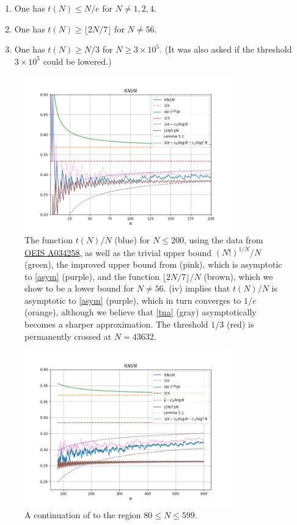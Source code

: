 \documentclass[12pt,a4paper,reqno]{amsart}
\numberwithin{equation}{section}
\theoremstyle{plain}
\theoremstyle{definition}
\begin{document}
\begin{enumerate}
\item One has $t(N) \leq N/e$ for $N \neq 1,2,4$.
\item One has $t(N) \geq \lfloor 2N/7 \rfloor$ for $N \neq 56$.
\item One has $t(N) \geq N/3$ for $N \geq 3 \times 10^5$.  (It was also asked if the threshold $3 \times 10^5$ could be lowered.) 
\end{enumerate}

\begin{figure}
  \centering
  \includegraphics[width=0.8\textwidth]{newplot_200.png}
  \vspace{-8pt}
  \caption{The function $t(N)/N$ (blue) for $N \leq 200$, using the data from \href{https://oeis.org/A034258}{OEIS A034258}, as well as the trivial upper bound $(N!)^{1/N}/N$ (green), the improved upper bound from  (pink), which is asymptotic to \eqref{asym} (purple), and the function $\lfloor 2N/7 \rfloor/N$ (brown), which we show to be a lower bound for $N \neq 56$.  (iv) implies that $t(N)/N$ is asymptotic to \eqref{asym} (purple), which in turn converges to $1/e$ (orange), although we believe that \eqref{tna} (gray) asymptotically becomes a sharper approximation.  The threshold $1/3$ (red) is permanently crossed at $N=43632$. 
  }\label{fig1}
  \end{figure}
  
  \begin{figure}
    \centering
    \includegraphics[width=0.8\textwidth]{newplot_600_all.png}
    \caption{A continuation of  to the region $80 \leq N \leq 599$. }\label{fig1-alt}
  \end{figure}
  
\end{document}
